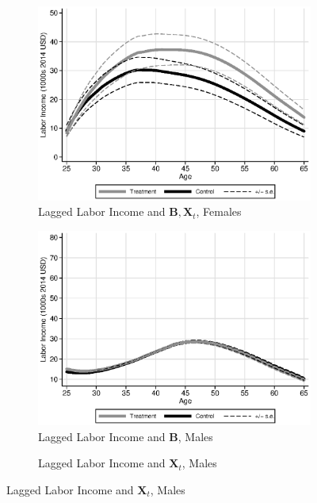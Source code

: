 \begin{figure}
\begin{subfigure}[h]{0.3\textwidth}
	\caption{Lagged Labor Income and $\bm{B}, \bm{X}_{t}$, Females} 
		\includegraphics[width=\textwidth]{output/labor_25-65_pset1_mset3_female.eps}
\end{subfigure}
\begin{subfigure}[h]{0.3\textwidth}
		\centering
		\caption{Lagged Labor Income and $\bm{B}$, Males} 
		\includegraphics[width=\textwidth]{output/labor_25-65_pset3_mset3_male.eps}
\end{subfigure}%
\begin{subfigure}[h]{0.3\textwidth}
	\centering
	\caption{Lagged Labor Income and $\bm{X}_{t}$, Males} 

\end{subfigure}
\end{figure}
